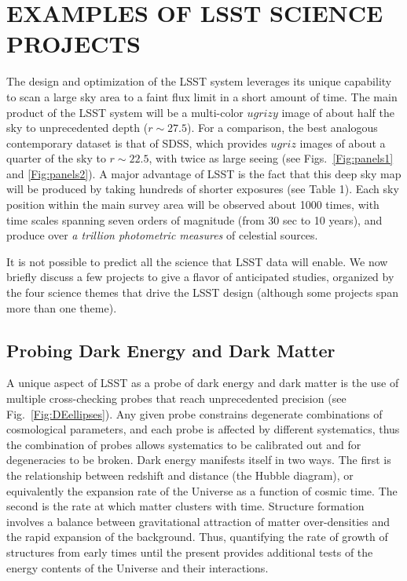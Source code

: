 
\section{  EXAMPLES OF LSST SCIENCE PROJECTS                    }
\label{Sec:science}

The design and optimization of the LSST system leverages its unique capability
to scan a large sky area to a faint flux limit in a short amount of time.
The main product of the LSST system will be a multi-color $ugrizy$ image of about
half the sky to unprecedented depth ($r\sim27.5$). For a comparison, the best
analogous contemporary dataset is that of SDSS, which provides $ugriz$ images
of about a quarter of the sky to $r\sim22.5$, with twice as large seeing
(see Figs.~\ref{Fig:panels1} and \ref{Fig:panels2}). A major advantage of LSST
is the fact that this deep sky map will be produced by taking hundreds of
shorter exposures (see Table 1). Each sky position within the main survey area
will be observed about 1000 times, with time scales spanning seven orders of
magnitude (from 30 sec to 10 years), and produce over {\it a trillion
photometric measures} of celestial sources.

It is not possible to predict all the science that LSST data will enable.
We now briefly discuss a few projects to give a flavor of anticipated studies,
organized by the four science themes that drive the LSST design
(although some projects span more than one theme).


\vskip 0.3in
\subsection{Probing Dark Energy and Dark Matter }

A unique aspect of LSST as a probe of dark energy and dark matter is
the use of multiple cross-checking probes that reach unprecedented
precision (see Fig.~\ref{Fig:DEellipses}). Any given probe constrains
degenerate combinations of cosmological parameters, and each probe is
affected by different systematics, thus the combination of probes
allows systematics to be calibrated out and for degeneracies to be
broken.  Dark energy manifests itself in two ways.  The first is the
relationship between redshift and distance (the Hubble diagram), or
equivalently the expansion rate of the Universe as a function of
cosmic time.  The second is the rate at which matter clusters with
time.
Structure formation involves a balance between
gravitational attraction of matter over-densities and the rapid
expansion of the background.  Thus, quantifying the rate of growth of
structures from early times until the present provides additional
tests of the energy contents of the Universe and their interactions.

